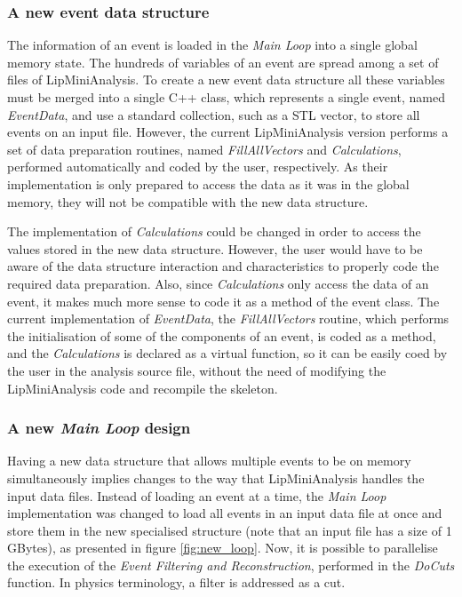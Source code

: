 \subsubsection*{A new event data structure}

The information of an event is loaded in the \textit{Main Loop} into a single global memory state. The hundreds of variables of an event are spread among a set of files of LipMiniAnalysis. To create a new event data structure all these variables must be merged into a single C++ class, which represents a single event, named \textit{EventData}, and use a standard collection, such as a STL vector, to store all events on an input file. However, the current LipMiniAnalysis version performs a set of data preparation routines, named \textit{FillAllVectors} and \textit{Calculations}, performed automatically and coded by the user, respectively. As their implementation is only prepared to access the data as it was in the global memory, they will not be compatible with the new data structure. 

The implementation of \textit{Calculations} could be changed in order to access the values stored in the new data structure. However, the user would have to be aware of the data structure interaction and characteristics to properly code the required data preparation. Also, since \textit{Calculations} only access the data of an event, it makes much more sense to code it as a method of the event class. The current implementation of \textit{EventData}, the \textit{FillAllVectors} routine, which performs the initialisation of some of the components of an event, is coded as a method, and the \textit{Calculations} is declared as a virtual function, so it can be easily coed by the user in the analysis source file, without the need of modifying the LipMiniAnalysis code and recompile the skeleton.

\subsubsection*{A new \textit{Main Loop} design}

Having a new data structure that allows multiple events to be on memory simultaneously implies changes to the way that LipMiniAnalysis handles the input data files. Instead of loading an event at a time, the \textit{Main Loop} implementation was changed to load all events in an input data file at once and store them in the new specialised structure (note that an input file has a size of 1 GBytes), as presented in figure \ref{fig:new_loop}. Now, it is possible to parallelise the execution of the \textit{Event Filtering and Reconstruction}, performed in the \textit{DoCuts} function. In physics terminology, a filter is addressed as a cut.

